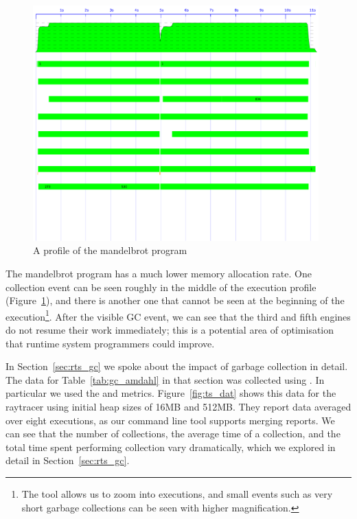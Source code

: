 \begin{figure}
\includegraphics[width=0.98\textwidth]{pics/mandelbrot_eventlog}
\caption{A profile of the mandelbrot program}
\label{fig:ts_mandelbrot}
\end{figure}

The mandelbrot program has a much lower memory allocation rate.
One collection event can be seen roughly in the middle of the execution
profile (Figure~\ref{fig:ts_mandelbrot}),
and there is another one that cannot be seen at the beginning of the
execution\footnote{
    The \tscope tool allows us to zoom into executions,
    and small events such as very short garbage collections can be seen with
    higher magnification.}.
After the visible GC event,
we can see that the third and fifth engines do not resume their work
immediately;
this is a potential area of optimisation that runtime system programmers
could improve.

In Section~\ref{sec:rts_gc} we spoke about the impact of garbage collection
in detail.
The data for Table~\ref{tab:gc_amdahl} in that section was collected using
\tscope.
In particular we used the  and 
metrics.
Figure~\ref{fig:ts_dat} shows this data for the
raytracer using initial heap sizes of 16MB and 512MB.
They report data averaged over eight executions,
as our command line tool supports merging \tscope reports.
We can see that the number of collections, 
the average time of a collection,
and the total time spent performing collection vary dramatically,
which we explored in detail in Section~\ref{sec:rts_gc}.

